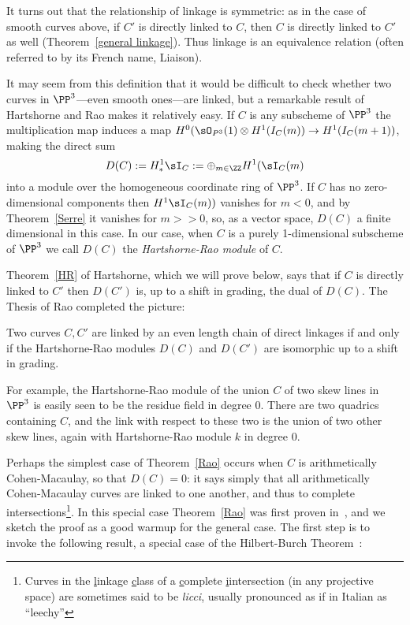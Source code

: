 It turns out that the relationship of linkage is symmetric: as in the case of smooth curves above, if 
$C'$ is directly linked to $C$, then $C$ is directly linked to $C'$ as well (Theorem~\ref{general linkage}).
Thus
linkage is an equivalence relation (often referred to by its French name, Liaison).

It may seem from this definition that it would be difficult to check whether two curves in $\PP^3$---even smooth ones---are linked, but
a remarkable result of Hartshorne and Rao makes it relatively easy. If $C$ is any subscheme of $\PP^3$ the multiplication map
induces a map
$H^0(\sO_{P^3}(1) \otimes H^1(I_C(m)) \to H^1(I_C(m+1))$, making the direct sum
$$
D(C) := H^1_*\sI_C := \oplus_{m\in \ZZ} H^1(\sI_C(m)
$$
into a module over the homogeneous coordinate ring of $\PP^3$. If $C$ has no zero-dimensional components then $H^1\sI_C(m))$ vanishes
for $m<0$, and by Theorem~\ref{Serre} it vanishes for $m>>0$, so, as a vector space, $D(C)$ a finite dimensional in this case.
In our case, when $C$ is a purely 1-dimensional subscheme of $\PP^3$ we call $D(C)$ the \emph{Hartshorne-Rao module} of $C$.

Theorem~\ref{HR} of Hartshorne, which we will prove below,
says that if $C$ is directly linked to $C'$ then $D(C')$ is, up to a shift in grading, the dual of $D(C)$. The Thesis of Rao completed the picture:

\begin{theorem}\cite{MR520926}\label{Rao}
Two curves $C,C'$ are linked by an even length chain of direct linkages if and only if 
the Hartshorne-Rao modules $D(C)$ and $D(C')$ are isomorphic up to a shift in grading.
\end{theorem}

For example, the Hartshorne-Rao module of the union $C$ of two skew lines in $\PP^3$ is easily seen to be the residue field in degree 0. There are
two quadrics containing $C$, and the link with respect to these two is the union of two other skew lines, again with Hartshorne-Rao module
$k$ in degree 0. 

Perhaps the simplest case of Theorem~\ref{Rao} occurs when $C$ is arithmetically Cohen-Macaulay, so that $D(C) = 0$: it says simply that all 
arithmetically Cohen-Macaulay curves are linked to one another, and thus to complete intersections\footnote{Curves in the {\underline l}inkage 
{\underline c}lass of a {\underline c}omplete {\underline i}intersection (in any projective space) are sometimes said to be \emph{licci}, usually
pronounced as if in Italian as ``leechy''}. In this special case Theorem~\ref{Rao} was first proven in~\cite{Gaeta}, and we sketch the
 proof as a good warmup for the general case.
The first step is to invoke the following result, a special case of the Hilbert-Burch Theorem~\cite[Section 20.4]{Eisenbud1995}:


